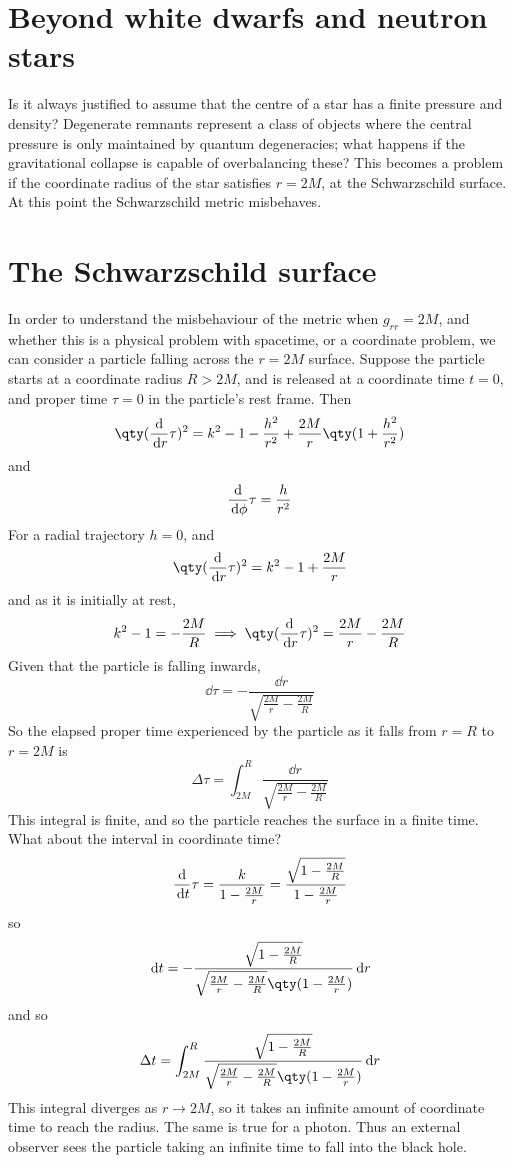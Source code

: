 
\section{Beyond white dwarfs and neutron stars}
\label{sec:beyond-white-dwarfs}

Is it always justified to assume that the centre of a star has a
finite pressure and density? Degenerate remnants represent a class of
objects where the central pressure is only maintained by quantum
degeneracies; what happens if the gravitational collapse is capable of
overbalancing these? This becomes a problem if the coordinate radius
of the star satisfies $r=2M$, at the Schwarzschild surface. At this
point the Schwarzschild metric misbehaves.

\section{The Schwarzschild surface}
\label{sec:schw-surf}

In order to understand the misbehaviour of the metric when $g_{rr} =
2M$, and whether this is a physical problem with spacetime, or a
coordinate problem, we can consider a particle falling across the
$r=2M$ surface. Suppose the particle starts at a coordinate radius
$R>2M$, and is released at a coordinate time $t=0$, and proper time
$\tau=0$ in the particle's rest frame. Then
\[ \qty( \dv{r}{\tau} )^2 = k^2 - 1 - \frac{h^2}{r^2} + \frac{2M}{r} \qty( 1+ \frac{h^2}{r^2}) \]
and
\[ \frac{\mathrm{d}}{\,\mathrm{d} \phi}{\tau} = \frac{h}{r^2} \]
For a radial trajectory $h=0$, and 
\[ \qty( \dv{r}{\tau})^2 = k^2 -1 + \frac{2M}{r} \]
and as it is initially at rest,
\[ k^2-1=- \frac{2M}{R} \implies \qty( \dv{r}{\tau})^2 = \frac{2M}{r}-\frac{2M}{R}   \]
Given that the particle is falling inwards,
\[ \dd{\tau} = - \frac{\dd{r}}{\sqrt{\frac{2M}{r} - \frac{2M}{R}}} \]
So the elapsed proper time experienced by the particle as it falls
from $r=R$ to $r=2M$ is
\begin{equation}
  \label{eq:231}
  \Delta \tau = \int_{2M}^R \frac{\dd{r}}{\sqrt{\frac{2M}{r} - \frac{2M}{R}}}
\end{equation}
This integral is finite, and so the particle reaches the surface in a
finite time. What about the interval in coordinate time?
\[ \frac{\mathrm{d}}{\,\mathrm{d} t}{\tau} = \frac{k}{1-\frac{2M}{r}} = \frac{\sqrt{1- \frac{2M}{R}}}{1-\frac{2M}{r}} \]
so
\[ \dd{t} = - \frac{\sqrt{1 - \frac{2M}{R}}}{\sqrt{\frac{2M}{r} - \frac{2M}{R}} \qty( 1 - \frac{2M}{r})} \dd{r} \]
and so
\begin{equation}
  \label{eq:233}
  \Delta t = \int_{2M}^R  \frac{\sqrt{1 - \frac{2M}{R}}}{\sqrt{\frac{2M}{r} - \frac{2M}{R}} \qty( 1 - \frac{2M}{r})} \dd{r}
\end{equation}
This integral diverges as $r \to 2M$, so it takes an infinite amount
of coordinate time to reach the radius. The same is true for a
photon. Thus an external observer sees the particle taking an infinite
time to fall into the black hole.

